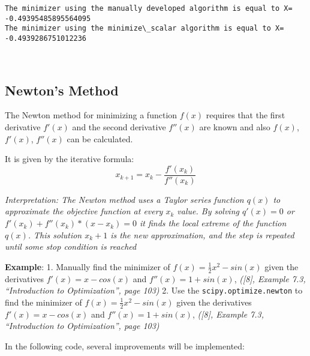 \documentclass[11pt]{article}
\begin{document}
    \begin{Verbatim}[commandchars=\\\{\}]
The minimizer using the manually developed algorithm is equal to X=
-0.49395485895564095
The minimizer using the minimize\_scalar algorithm is equal to X=
-0.4939286751012236
    \end{Verbatim}

    \begin{center}
    \end{center}
    { \hspace*{\fill} \\}
    
    \subsection{Newton's Method}\label{newtons-method}

The Newton method for minimizing a function \(f(x)\) requires that the
first derivative \(f'(x)\) and the second derivative \(f''(x)\) are
known and also \(f(x)\), \(f'(x)\), \(f''(x)\) can be calculated.

It is given by the iterative formula: \[
x_{k+1} = x_k - \frac{f'(x_k)}{f''(x_k)}
\]

\emph{Interpretation: The Newton method uses a Taylor series function
\(q(x)\) to approximate the objective function at every \(x_k\) value.
By solving \(q'(x)=0\) or \(f'(x_k) + f''(x_k)*(x-x_k)=0\) it finds the
local extreme of the function \(q(x)\). This solution \(x_k+1\) is the
new approximation, and the step is repeated until some stop condition is
reached}

    \textbf{Example}: 1. Manually find the minimizer of
\(f(x) = \frac{1}{2}x^2 - sin(x)\) given the derivatives
\(f'(x) = x - cos(x)\) and \(f''(x) = 1 + sin(x)\), \emph{({[}8{]},
Example 7.3, ``Introduction to Optimization'', page 103)} 2. Use the
\texttt{scipy.optimize.newton} to find the minimizer of
\(f(x) = \frac{1}{2}x^2 - sin(x)\) given the derivatives
\(f'(x) = x - cos(x)\) and \(f''(x) = 1 + sin(x)\), \emph{({[}8{]},
Example 7.3, ``Introduction to Optimization'', page 103)}

    In the following code, several improvements will be implemented:
\end{document}

